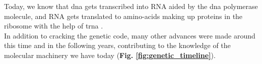 Today, we know that \gls{dna} gets transcribed into RNA aided by the \gls{dna} polymerase molecule, and RNA gets translated to amino-acids making up proteins in the ribosome with the help of \gls{trna} \cite{alberts2018molecular}.\\

In addition to cracking the genetic code, many other advances were made around this time and in the following years, contributing to the knowledge of the molecular machinery we have today (\textbf{Fig. \ref{fig:genetic_timeline}}).


